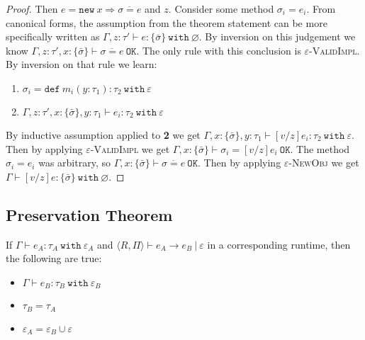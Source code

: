 \documentclass[a4paper,UKenglish]{lipics-v2016}
\newcommand{\kw}[1]{\mathtt{ #1 }~}
\newcommand{\kwa}[1]{\mathtt{ #1 }}
\newcommand{\newbasic}[0]{
	\kwa{new}~x \Rightarrow \overline{\sigma = e}
}
\newcommand{\rctx}[0]{ \langle R, \Pi \rangle }
\begin{document}
\begin{proof}
\noindent
{}
Then $e = \newbasic$ and $z$. Consider some method $\sigma_i = e_i$. From canonical forms, the assumption from the theorem statement can be more specifically written as $\Gamma, z: \tau' \vdash e: \{ \bar \sigma \}~\kw{with} \varnothing$.  By inversion on this judgement we know $\Gamma, z: \tau', x: \{ \bar \sigma \} \vdash \overline{\sigma = e}~\kwa{OK}$. The only rule with this conclusion is \textsc{$\varepsilon$-ValidImpl}. By inversion on that rule we learn:

\begin{enumerate}
	\item $\sigma_i = \kw{def} m_i(y: \tau_1): \tau_2~\kw{with} \varepsilon$
	\item $\Gamma, z: \tau', x: \{ \bar \sigma \}, y: \tau_1 \vdash e_i: \tau_2~\kw{with} \varepsilon$
\end{enumerate}

\noindent
By inductive assumption applied to \textbf{2} we get $\Gamma, x: \{ \bar \sigma \}, y: \tau_1 \vdash [v/z]e_i : \tau_2~\kw{with} \varepsilon$. Then by applying \textsc{$\varepsilon$-ValidImpl} we get $\Gamma, x: \{ \bar \sigma \} \vdash \sigma_i = [v/z]e_i~\kwa{OK}$. The method $\sigma_i = e_i$ was arbitrary, so $\Gamma, x: \{ \bar \sigma \} \vdash \overline{\sigma = e}~\kwa{OK}$. Then by applying \textsc{$\varepsilon$-NewObj} we get $\Gamma \vdash [v/z]e: \{ \bar \sigma \}~\kw{with} \varnothing$.
\end{proof}

\subsection{Preservation Theorem}

\begin{theorem}
If $\Gamma \vdash e_A: \tau_A~\kw{with} \varepsilon_A$ and $\rctx \vdash e_A \longrightarrow e_B~|~\varepsilon$ in a corresponding runtime, then the following are true:

\begin{itemize}
	\item $\Gamma \vdash e_B: \tau_B~\kw{with} \varepsilon_B$
	\item $\tau_B = \tau_A$
	\item $\varepsilon_A = \varepsilon_B \cup \varepsilon$
\end{itemize}

\end{theorem}
\end{document}
